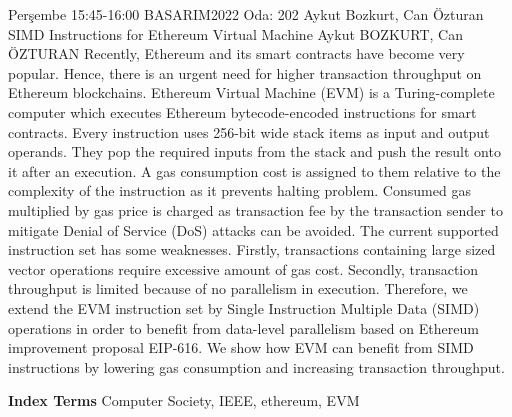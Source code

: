 
    \begin{abstract_basarim}
    {Perşembe 15:45-16:00}
    {BASARIM2022}
    {Oda: 202}
    {Aykut Bozkurt, Can Özturan}
    {SIMD Instructions for Ethereum Virtual Machine}
    {%
    Aykut BOZKURT, Can ÖZTURAN}
    {%
    }
    {%
    }
    Recently, Ethereum and its smart contracts have become very popular. Hence, there is an urgent need for higher transaction throughput on Ethereum blockchains. Ethereum Virtual Machine (EVM) is a Turing-complete computer which executes Ethereum bytecode-encoded instructions for smart contracts. Every instruction uses 256-bit wide stack items as input and output operands. They pop the required inputs from the stack and push the result onto it after an execution. A gas consumption cost is assigned to them relative to the complexity of the instruction as it prevents halting problem. Consumed gas multiplied by gas price is charged as transaction fee by the transaction sender to mitigate Denial of Service (DoS) attacks can be avoided. The current supported instruction set has some weaknesses. Firstly, transactions containing large sized vector operations require excessive amount of gas cost. Secondly, transaction throughput is limited because of no parallelism in execution. Therefore, we extend the EVM instruction set by Single Instruction Multiple Data (SIMD) operations in order to benefit from data-level parallelism based on Ethereum improvement proposal EIP-616. We show how EVM can benefit from SIMD instructions by lowering gas consumption and increasing transaction throughput. 
    
            \textbf{Index Terms} \newline{}Computer Society, IEEE, ethereum, EVM
    \end{abstract_basarim}
    
